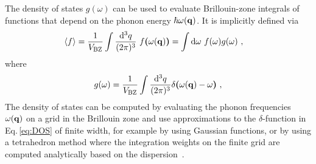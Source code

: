 The density of states $g (\omega)$ can be used to evaluate Brillouin-zone integrals of functions that depend on the phonon energy $\hbar \omega ({\bf q})$. It is implicitly defined via
\begin{align}
	\braket{f}
		&= \frac{1}{V_{\rm BZ}} \int \frac{{\rm d}^3 q}{(2 \pi)^3} ~ f{\boldsymbol (}\omega ({\bf q}) \boldsymbol ) 
		= \int {\rm d} \omega ~ f(\omega) g (\omega)~,
\end{align}
where 
\begin{align}
	g(\omega) 
		= \frac{1}{V_{\rm BZ}} \int \frac{\d^3 q}{(2 \pi)^3} \delta \boldsymbol{(}
			\omega ({\bf q}) - \omega
		\boldsymbol{)}~,
	\label{eq:DOS}
\end{align}
The density of states can be computed by evaluating the phonon frequencies $\omega ({\bf q})$ on a grid in the Brillouin zone and use approximations to the $\delta$-function in Eq.\,\eqref{eq:DOS} of finite width, for example by using Gaussian functions, or by using a tetrahedron method where the integration weights on the finite grid are computed analytically based on the dispersion~\cite{Bloechl1994}.

